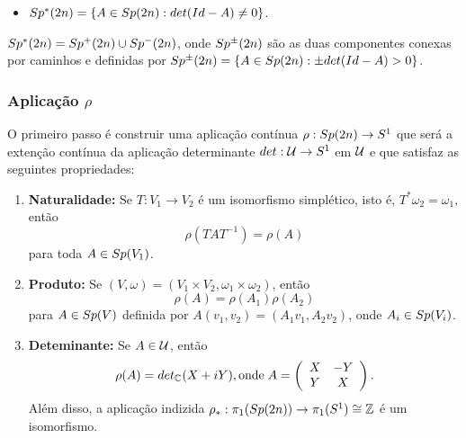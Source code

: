 \documentclass{beamer}
\begin{document}
\begin{footnotesize}
\begin{frame}
		\begin{itemize}
			\item $Sp^{*}(2n)=\{ A \in Sp(2n): det(Id-A)\neq 0 \}$.
		\end{itemize}
		
		\begin{lema}
			$Sp^{*}(2n) = Sp^{+}(2n)\cup Sp^{-}(2n)$, onde $Sp^{\pm}(2n)$ são as duas componentes conexas por caminhos e definidas por $
			Sp^{\pm}(2n) = \{ A \in Sp(2n): \pm det(Id-A)> 0 \}
			$.
		\end{lema}
		
		
	\end{frame}
	
	\begin{frame}
		\frametitle{Aplicação $\rho$}
		
		O primeiro passo é construir uma aplicação contínua $\rho: Sp(2n)\to S^{1}$ que será a extenção contínua da aplicação determinante $det:\mathcal{U}\to S^{1}$ em $\mathcal{U}$ e que satisfaz as seguintes propriedades:
		
		\begin{scriptsize}
			\begin{enumerate}
				\item \textbf{Naturalidade:}  Se $T:V_{1} \to V_{2}$ é um isomorfismo simplético, isto é, $T^{*}\omega_{2} = \omega_{1}, $então 
				$$
				\rho(TAT^{-1}) = \rho(A)
				$$
				para toda $A\in Sp(V_{1})$.
				
				\item \textbf{Produto:} Se $(V,\omega) = (V_{1}\times V_{2},\omega_{1}\times \omega_{2})$, então
				$$
				\rho(A) = \rho(A_{1})\rho(A_{2})
				$$
				para $A\in Sp(V)$ definida por $A(v_{1}, v_{2})=(A_{1}v_{1}, A_{2}v_{2})$, onde $A_{i} \in Sp(V_{i})$.
			
			
			\item \textbf{Deteminante:} Se $A\in \mathcal{U}$, então 
			$$
			\rho(A) = det_{\mathbb{C}^{}}(X+iY), \text{onde} \;	
			A=\left(
			\begin{array}{cc}
			X & -Y					\\
			Y & X
			\end{array}
			\right).
			$$
			Além disso, a aplicação indizida $\rho_{*}: \pi_{1}(Sp(2n)) \to \pi_{1}(S^{1}) \cong \mathbb{Z}$ é um isomorfismo.
			

\end{enumerate}
\end{scriptsize}
\end{frame}
\end{footnotesize}
\end{document}
